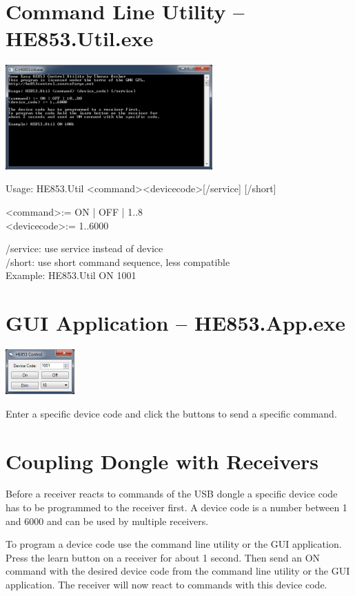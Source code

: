 \documentclass[
a4paper,
oneside,
halfparskip*,
normalheadings,
]
{scrbook}
\begin{document}
\section{Command Line Utility -- HE853.Util.exe}

\includegraphics[width=300px]{cmd.png}

Usage: HE853.Util \textless command\textgreater \textless device\textunderscore code\textgreater [/service] [/short]

\textless command\textgreater := ON | OFF | 1..8 \\
\textless device\textunderscore code\textgreater := 1..6000

/service: use service instead of device \\
/short: use short command sequence, less compatible \\

Example: HE853.Util ON 1001

\section{GUI Application -- HE853.App.exe}

\includegraphics[width=100px]{gui.png}

Enter a specific device code and click the buttons to send a specific command.

\section{Coupling Dongle with Receivers}

Before a receiver reacts to commands of the USB dongle a specific device code has to be
programmed to the receiver first. A device code is a number between 1 and 6000 and can
be used by multiple receivers.

To program a device code use the command line utility or the GUI application. Press the
learn button on a receiver for about 1 second. Then send an ON command with the desired
device code from the command line utility or the GUI application. The receiver will now
react to commands with this device code.
\end{document}
